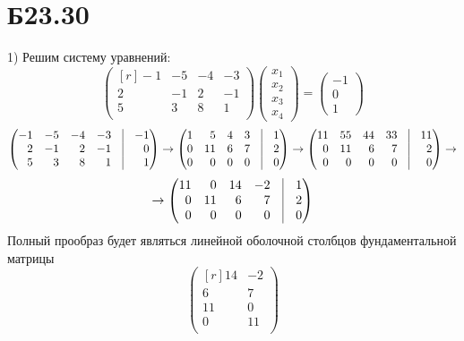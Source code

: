 \documentclass[a4paper,12pt]{article} %
\begin{document}
\section*{Б23.30}1)
Решим систему уравнений:
$$\begin{pmatrix*}[r]
    -1&-5&-4&-3\\
    2&-1&2&-1\\
    5&3&8&1\\
\end{pmatrix*}\begin{pmatrix*}
    x_1\\
    x_2\\
    x_3\\
    x_4
\end{pmatrix*}=\begin{pmatrix*}
    -1\\
    0\\
    1
\end{pmatrix*}$$
$$\begin{pmatrix*}[r]
    -1&-5&-4&-3&\vline&-1\\
    2&-1&2&-1&\vline&0\\
    5&3&8&1&\vline&1\\
\end{pmatrix*}\rightarrow\begin{pmatrix*}[r]
    1&5&4&3&\vline&1\\
    0&11&6&7&\vline&2\\
    0&0&0&0&\vline&0\\
\end{pmatrix*}\rightarrow\begin{pmatrix*}[r]
    11&55&44&33&\vline&11\\
    0&11&6&7&\vline&2\\
    0&0&0&0&\vline&0\\
\end{pmatrix*}\rightarrow$$
$$\rightarrow\begin{pmatrix*}[r]
    11&0&14&-2&\vline&1\\
    0&11&6&7&\vline&2\\
    0&0&0&0&\vline&0\\
\end{pmatrix*}$$
Полный прообраз будет являться линейной оболочной столбцов фундаментальной матрицы $$\begin{pmatrix*}[r]
    14&-2\\
    6&7\\
    11&0\\
    0&11\\
\end{pmatrix*}$$
\end{document}
